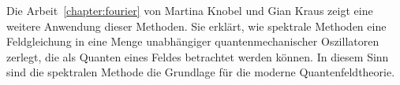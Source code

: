 Die Arbeit~\ref{chapter:fourier} von Martina Knobel und Gian Kraus
zeigt eine weitere Anwendung dieser Methoden.
Sie erklärt, wie spektrale Methoden eine Feldgleichung in eine Menge
unabhängiger quantenmechanischer Oszillatoren zerlegt, die als Quanten
eines Feldes betrachtet werden können.
In diesem Sinn sind die spektralen Methode die Grundlage für die
moderne Quantenfeldtheorie.

